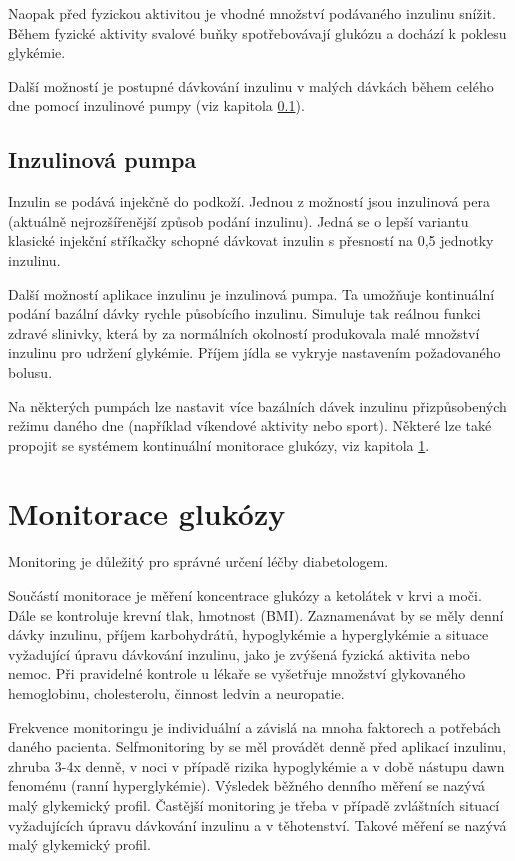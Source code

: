 Naopak před fyzickou aktivitou je vhodné množství podávaného inzulinu snížit. Během fyzické aktivity svalové buňky spotřebovávají glukózu a dochází k poklesu glykémie.

Další možností je postupné dávkování inzulinu v malých dávkách během celého dne pomocí inzulinové pumpy (viz kapitola \ref{ch:pumpa}).


\subsection{Inzulinová pumpa}
\label{ch:pumpa}

Inzulin se podává injekčně do podkoží. Jednou z možností jsou inzulinová pera (aktuálně nejrozšířenější způsob podání inzulinu). Jedná se o lepší variantu klasické injekční stříkačky schopné dávkovat inzulin s přesností na 0,5 jednotky inzulinu.

Další možností aplikace inzulinu je inzulinová pumpa. Ta umožňuje kontinuální podání bazální dávky rychle působícího inzulinu. Simuluje tak reálnou funkci zdravé slinivky, která by za normálních okolností produkovala malé množství inzulinu pro udržení glykémie. Příjem jídla se vykryje nastavením požadovaného bolusu.

Na některých pumpách lze nastavit více bazálních dávek inzulinu přizpůsobených režimu daného dne (například víkendové aktivity nebo sport). Některé lze také propojit se systémem kontinuální monitorace glukózy, viz kapitola \ref{ch:monitorace}. \cite{Diabetes.Perusicova,Diabetes.Rybka} 


\section{Monitorace glukózy}
\label{ch:monitorace}

Monitoring je důležitý pro správné určení léčby diabetologem.

Součástí monitorace je měření koncentrace glukózy a ketolátek v krvi a moči. Dále se kontroluje krevní tlak, hmotnost (BMI). Zaznamenávat by se měly denní dávky inzulinu, příjem karbohydrátů, hypoglykémie a hyperglykémie a situace vyžadující úpravu dávkování inzulinu, jako je zvýšená fyzická aktivita nebo nemoc. Při pravidelné kontrole u lékaře se vyšetřuje množství glykovaného hemoglobinu, cholesterolu, činnost ledvin a neuropatie.

Frekvence monitoringu je individuální a závislá na mnoha faktorech a potřebách daného pacienta. Selfmonitoring by se měl provádět denně před aplikací inzulinu, zhruba 3-4x denně, v noci v případě rizika hypoglykémie a v době nástupu dawn fenoménu (ranní hyperglykémie). Výsledek běžného denního měření se nazývá malý glykemický profil. Častější monitoring je třeba v případě zvláštních situací vyžadujících úpravu dávkování inzulinu a v těhotenství. Takové měření se nazývá malý glykemický profil.

